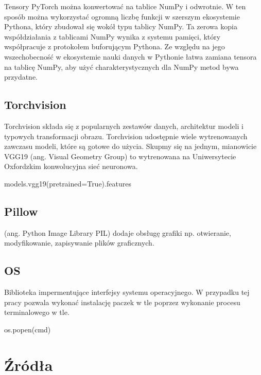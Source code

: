 \documentclass[brudnopis]{xmgr}
\begin{document}
Tensory PyTorch można konwertować na tablice NumPy i odwrotnie. W ten sposób można wykorzystać ogromną liczbę funkcji w szerszym ekosystemie Pythona, który zbudował się wokół typu tablicy NumPy. Ta zerowa kopia współdziałania z tablicami NumPy wynika z systemu pamięci, który współpracuje z protokołem buforującym Pythona. 
Ze względu na jego wszechobecność w ekosystemie nauki danych w Pythonie łatwa zamiana tensora na tablicę NumPy, aby użyć charakterystycznych dla NumPy metod bywa przydatne.

    \section{Torchvision\label{s:dsssl}}
    
    Torchvision składa się z popularnych zestawów danych, architektur modeli i typowych transformacji obrazu. Torchvision udostępnie wiele wytrenowanych zawczasu modeli, które są gotowe do użycia. Skupmy się na jednym, mianowicie VGG19 (ang. Visual Geometry Group) to wytrenowana na Uniwersytecie Oxfordzkim  konwolucyjna sieć neuronowa.

models.vgg19(pretrained=True).features

    \section{Pillow\label{s:dsssl}}
    
    (ang. Python Image Library PIL) dodaje obsługę grafiki np. otwieranie, modyfikowanie, zapisywanie plików graficznych.
    
        \section{OS\label{s:dsssl}}
        
        Biblioteka impermentujące  interfejsy systemu operacyjnego. W przypadku tej pracy pozwala wykonać instalację paczek w tle poprzez wykonanie procesu terminalowego w tle. 

os.popen(cmd)

\chapter{Źródła}
\end{document}
